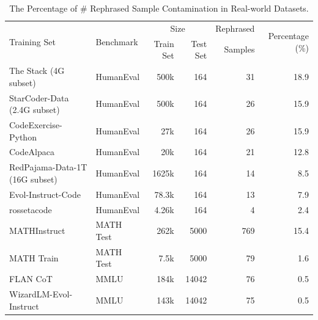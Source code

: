 \begin{table}[h]
\centering
\caption{The Percentage of \# Rephrased Sample Contamination in Real-world Datasets.}
\label{table:dataset_summary}
\begin{tabular}{l|l|r|r|r|r}
\toprule
\multirow{2}{*}{Training Set} & \multirow{2}{*}{Benchmark} & \multicolumn{2}{c|}{Size} & Rephrased  & \multirow{2}{*}{Percentage (\%)} \\
& & Train Set & Test Set & Samples & \\
\midrule
The Stack (4G subset) & HumanEval & 500k & 164 & 31 & 18.9 \\
StarCoder-Data (2.4G subset) & HumanEval & 500k & 164 & 26 & 15.9 \\
CodeExercise-Python & HumanEval & 27k & 164 & 26 & 15.9 \\
CodeAlpaca & HumanEval & 20k & 164 & 21 & 12.8 \\
RedPajama-Data-1T (16G subset) & HumanEval & 1625k & 164 & 14 & 8.5 \\
Evol-Instruct-Code & HumanEval & 78.3k & 164 & 13 & 7.9 \\
rossetacode & HumanEval & 4.26k & 164 & 4 & 2.4 \\
MATHInstruct & MATH Test & 262k & 5000 & 769 & 15.4 \\
MATH Train & MATH Test & 7.5k & 5000 & 79 & 1.6 \\
FLAN CoT & MMLU & 184k & 14042 & 76 & 0.5 \\
WizardLM-Evol-Instruct & MMLU & 143k & 14042 & 75 & 0.5 \\
\bottomrule
\end{tabular}
\end{table}




